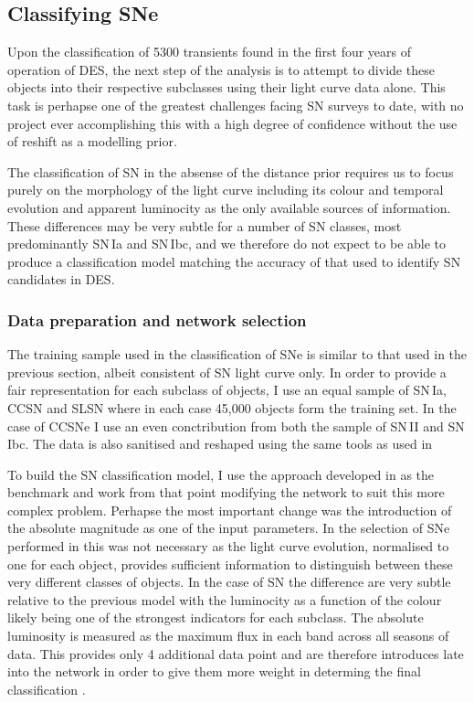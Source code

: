 \subsection{Classifying SNe}
Upon the classification of 5300 transients found in the first four years of operation of DES, the next step of the analysis is to attempt to divide these objects into their respective subclasses using their light curve data alone. This task is perhapse one of the greatest challenges facing SN surveys to date, with no project ever accomplishing this with a high degree of confidence without the use of reshift as a modelling prior.

The classification of SN in the absense of the distance prior requires us to focus purely on the morphology of the light curve including its colour and temporal evolution and apparent luminocity as the only available sources of information. These differences may be very subtle for a number of SN classes, most predominantly SN\,Ia and SN\,Ibc, and we therefore do not expect to be able to produce a classification model matching the accuracy of that used to identify SN candidates in DES.

\subsubsection{Data preparation and network selection} \label{sec:SNClassificationNetwork}
The training sample used in the classification of SNe is similar to that used in the previous section, albeit consistent of SN light curve only. In order to provide a fair representation for each subclass of objects, I use an equal sample of SN\,Ia, CCSN and SLSN where in each case 45,000 objects form the training set. In the case of CCSNe I use an even conctribution from both the sample of SN\,II and SN\,Ibc. The data is also sanitised and reshaped using the same tools as used in 

To build the SN classification model, I use the approach developed in  as the benchmark and work from that point modifying the network to suit this more complex problem. Perhapse the most important change was the introduction of the absolute magnitude as one of the input parameters. In the selection of SNe performed in  this was not necessary as the light curve evolution, normalised to one for each object, provides sufficient information to distinguish between these very different classes of objects. In the case of SN the difference are very subtle relative to the previous model with the luminocity as a function of the colour likely being one of the strongest indicators for each subclass. The absolute luminosity is measured as the maximum flux in each band across all seasons of data. This provides only 4 additional data point and are therefore introduces late into the network in order to give them more weight in determing the final classification .

